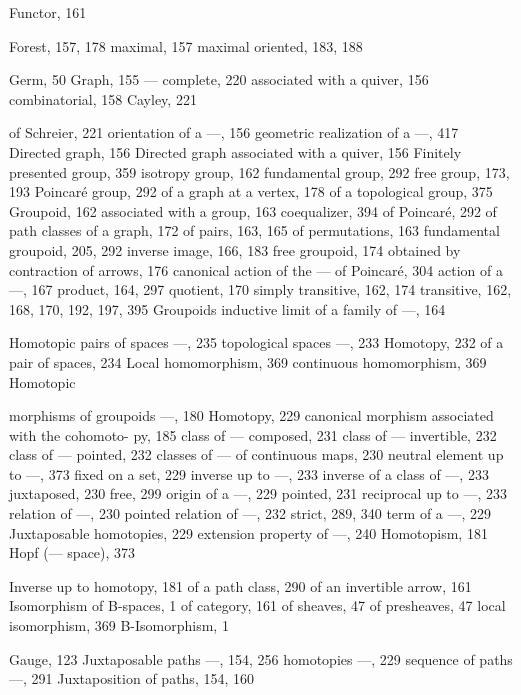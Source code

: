 Functor, 161

Forest, 157, 178 maximal, 157 maximal oriented, 183, 188


Germ, 50 Graph, 155 --- complete, 220 associated with a quiver, 156 combinatorial, 158 Cayley, 221

of Schreier, 221 orientation of a ---, 156 geometric realization of a ---, 417 Directed graph, 156 Directed graph associated with a quiver, 156 Finitely presented group, 359 isotropy group, 162 fundamental group, 292 free group, 173, 193 Poincaré group, 292 of a graph at a vertex, 178 of a topological group, 375 Groupoid, 162 associated with a group, 163 coequalizer, 394 of Poincaré, 292 of path classes of a graph, 172 of pairs, 163, 165 of permutations, 163 fundamental groupoid, 205, 292 inverse image, 166, 183 free groupoid, 174 obtained by contraction of arrows, 176 canonical action of the --- of Poincaré, 304 action of a ---, 167 product, 164, 297 quotient, 170 simply transitive, 162, 174 transitive, 162, 168, 170, 192, 197, 395 Groupoids inductive limit of a family of ---, 164


Homotopic pairs of spaces ---, 235 topological spaces ---, 233 Homotopy, 232 of a pair of spaces, 234 Local homomorphism, 369 continuous homomorphism, 369 Homotopic

morphisms of groupoids ---, 180 Homotopy, 229 canonical morphism associated with the cohomoto- py, 185 class of --- composed, 231 class of --- invertible, 232 class of --- pointed, 232 classes of --- of continuous maps, 230 neutral element up to ---, 373 fixed on a set, 229 inverse up to ---, 233 inverse of a class of ---, 233 juxtaposed, 230 free, 299 origin of a ---, 229 pointed, 231 reciprocal up to ---, 233 relation of ---, 230 pointed relation of ---, 232 strict, 289, 340 term of a ---, 229 Juxtaposable homotopies, 229 extension property of ---, 240 Homotopism, 181 Hopf (--- space), 373


Inverse up to homotopy, 181 of a path class, 290 of an invertible arrow, 161 Isomorphism of B-spaces, 1 of category, 161 of sheaves, 47 of presheaves, 47 local isomorphism, 369 B-Isomorphism, 1


Gauge, 123 Juxtaposable paths ---, 154, 256 homotopies ---, 229 sequence of paths ---, 291 Juxtaposition of paths, 154, 160

